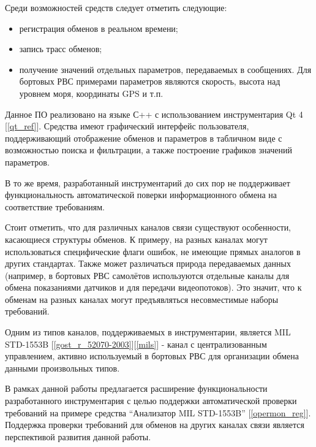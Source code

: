Среди возможностей средств следует отметить следующие:

\begin{itemize}
 \item регистрация обменов в реальном времени;
 \item запись трасс обменов;
 \item получение значений отдельных параметров, передаваемых в сообщениях. Для 
бортовых РВС примерами параметров являются скорость, высота над уровнем моря, 
координаты GPS и т.п.
\end{itemize}

Данное ПО реализовано на языке С++ с использованием инструментария Qt 4 
[\ref{qt_ref}]. Средства имеют графический интерфейс пользователя, 
поддерживающий отображение обменов и параметров в табличном виде с возможностью 
поиска и фильтрации, а также построение графиков значений параметров.


В то же время, разработанный инструментарий до сих пор не поддерживает 
функциональность автоматической поверки информационного обмена на соответствие 
требованиям.

Стоит отметить, что для различных каналов связи существуют особенности, 
касающиеся структуры обменов. К примеру, на разных каналах могут использоваться 
специфические флаги ошибок, не имеющие прямых аналогов в других стандартах. 
Также может различаться природа передаваемых данных (например, в бортовых РВС 
самолётов используются отдельные каналы для обмена показаниями датчиков и для 
передачи видеопотоков). Это значит, что к обменам на разных каналах могут 
предъявляться несовместимые наборы требований.

Одним из типов каналов, поддерживаемых в инструментарии, является MIL STD-1553B 
[\ref{gost_r_52070-2003}][\ref{mils}] - канал с централизованным управлением, 
активно используемый в бортовых РВС для организации обмена данными произвольных 
типов.

В рамках данной работы предлагается расширение функциональности разработанного 
инструментария с целью поддержки автоматической проверки требований на примере 
средства ``Анализатор MIL STD-1553B'' [\ref{opermon_reg}]. Поддержка проверки 
требований для обменов на других каналах связи является перспективой развития 
данной работы.